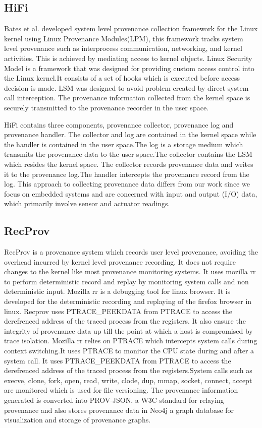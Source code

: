 \subsection{HiFi}
Bates et al. developed system level provenance collection framework for the Linux kernel using Linux Provenance Modules(LPM), this framework tracks system level provenance such as interprocess communication, networking, and kernel activities. This is achieved by mediating access to kernel objects. Linux Security Model is a framework that was designed for providing custom access control into the Linux kernel.It consists of a set of hooks which is executed before access decision is made. LSM was designed to avoid problem created by direct system call interception. The provenance information collected from the kernel space is securely transmitted to the provenance recorder in the user space. 
\par HiFi contains three components, provenance collector, provenance log and provenance handler. The collector and log are contained in the kernel space while the handler is contained in the user space.The log is a storage medium which transmits the provenance data to the user space.The collector contains the LSM which resides the kernel space. The collector records provenance data and writes it to the provenance log.The handler intercepts the provenance record from the log. This approach to collecting provenance data differs from our work since we focus on embedded systems and are concerned with input and output (I/O) data, which primarily involve sensor and actuator readings.

\subsection{RecProv}

RecProv is a provenance system which records user level provenance, avoiding the overhead incurred by kernel level provenance recording. It does not require changes to the kernel like most provenance monitoring systems. It uses mozilla rr to perform deterministic record and replay by monitoring system calls  and non deterministic input. Mozilla rr is a debugging tool for linux browser. It is developed for the deterministic recording and replaying of the firefox browser in linux. Recprov uses PTRACE\_PEEKDATA from PTRACE to access the derefrenced address of the traced process from the registers. It also ensure the integrity of provenance data up till the point at which a host is compromised by trace isolation. Mozilla rr relies on PTRACE which intercepts system calls during context switching.It uses PTRACE to monitor the CPU state during and after a system call. It uses PTRACE\_PEEKDATA from PTRACE to access the derefrenced address of the traced process from the registers.System calls such as execve, clone, fork, open, read, write, clode, dup, mmap, socket, connect, accept are monitored which is used for file versioning. The provenance information generated is converted into PROV-JSON, a W3C standard for relaying provenance and also stores provenance data in Neo4j a graph database for visualization and storage of provenance graphs. 

